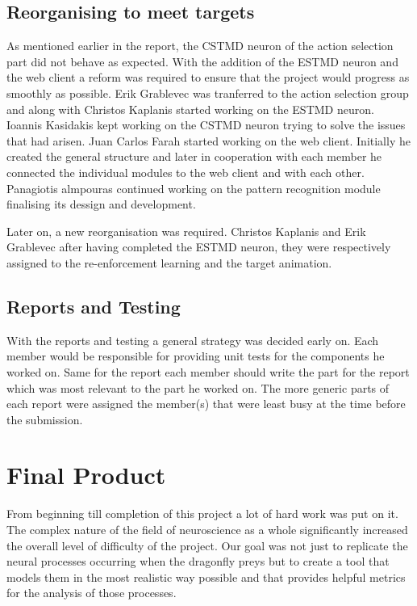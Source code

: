\documentclass[a4paper,11pt]{article}
\begin{document}
\subsection{Reorganising to meet targets}
As mentioned earlier in the report, the CSTMD neuron of the action selection part did not behave as expected. With the addition of the ESTMD neuron and the web client a reform was required to ensure that the project would progress as smoothly as possible. Erik Grablevec was tranferred to the action selection group and along with Christos Kaplanis started working on the ESTMD neuron. Ioannis Kasidakis kept working on the CSTMD neuron trying to solve the issues that had arisen. Juan Carlos Farah started working on the web client. Initially he created the general structure and later in cooperation with each member he connected the individual modules to the web client and with each other. Panagiotis almpouras continued working on the pattern recognition module finalising its dessign and development.\par

Later on, a new reorganisation was required. Christos Kaplanis  and Erik Grablevec after having completed the ESTMD neuron, they were respectively assigned to the re-enforcement learning and the target animation.

\subsection{Reports and Testing}
With the reports and testing a general strategy was decided early on. Each member would be responsible for providing unit tests for the components he worked on. Same for the report each member should write the part for the report which was most relevant to the part he worked on. The more generic parts of each report were assigned the member(s) that were least busy at the time before the submission.


\clearpage
\section{Final Product}

From beginning till completion of this project a lot of hard work was put on it. The complex nature of 
the field of neuroscience as a whole significantly increased the overall level of difficulty of the 
project. Our goal was not just to replicate the neural processes occurring when the dragonfly preys 
but to create a tool that models them in the most realistic way possible and that provides helpful 
metrics for the analysis of those processes.\par
\end{document}

